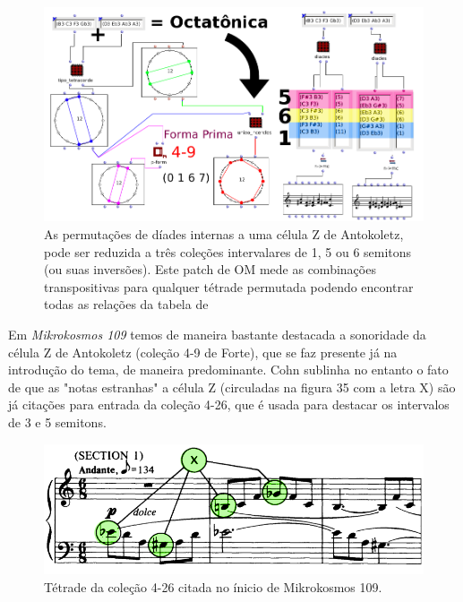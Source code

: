 \documentclass[
	12pt,				%
	openright,			%
	twoside,			%
	a4paper,			%
	english,			%
	french,				%
	spanish,			%
	brazil				%
	]{abntex2}
\begin{document}
\begin{figure}[!h]
	\caption{\label{fig_grafico} As permutações de díades internas a uma célula Z de Antokoletz, pode ser reduzida a três coleções intervalares de 1, 5 ou 6 semitons (ou suas inversões). Este patch de OM mede as combinações transpositivas para qualquer tétrade permutada podendo encontrar todas as relações da tabela de  }
	\begin{center}
	    \includegraphics[scale=0.55]{octa/permutaCEL_Z.png}
	\end{center}
\end{figure}

Em \textit{Mikrokosmos 109} temos de maneira bastante destacada a sonoridade da célula Z de Antokoletz (coleção 4-9 de Forte), que se faz presente já na introdução do tema, de maneira predominante. Cohn sublinha no entanto o fato de que as "notas estranhas" a célula Z (circuladas na figura 35 com a letra X) são já citações para entrada da coleção 4-26, que é usada para destacar os intervalos de 3 e 5 semitons.

\begin{figure}[!h]
	\caption{\label{fig_grafico} Tétrade da coleção 4-26 citada no ínicio de Mikrokosmos 109. }
	\begin{center}
	    \includegraphics[scale=0.3]{octa/mikro_Bali01.png}
	\end{center}
\end{figure}
\end{document}
